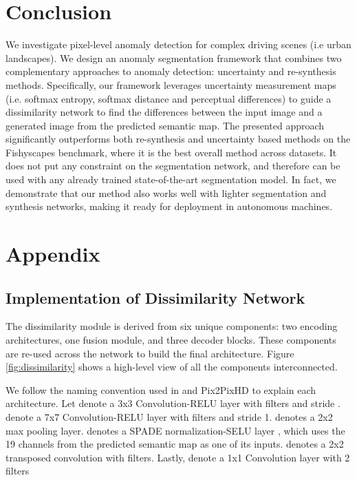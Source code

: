 \documentclass[final]{cvpr}
\begin{document}
 \section{Conclusion}
We investigate pixel-level anomaly detection for complex driving scenes (i.e urban landscapes).
We design an anomaly segmentation framework that combines two complementary approaches to anomaly detection: uncertainty and re-synthesis methods.
Specifically, our framework leverages uncertainty measurement maps (i.e. softmax entropy, softmax distance and perceptual differences) to guide a dissimilarity network to find the differences between the input image and a generated image from the predicted semantic map.
The presented approach significantly outperforms both re-synthesis and uncertainty based methods on the Fishyscapes benchmark, where it is the best overall method across datasets. It does not put any constraint on the segmentation network, and therefore can be used with any already trained state-of-the-art segmentation model. In fact, we demonstrate that our method also works well with lighter segmentation and synthesis networks, making it ready for deployment in autonomous machines.


 
{\small


}

\cleardoublepage
\appendix
\section{Appendix}
\label{appendix}
\subsection{Implementation of Dissimilarity Network}
\label{app:dissimilarity}
The dissimilarity module is derived from six unique components: two encoding architectures, one fusion module, and three decoder blocks. These components are re-used across the network to build the final architecture. Figure \ref{fig:dissimilarity} shows a high-level view of all the components interconnected.  

We follow the naming convention used in \cite{perceptual_diff} and Pix2PixHD \cite{Pix2PixHd} to explain each architecture. Let  denote a 3x3 Convolution-RELU layer with  filters and stride .  denote a 7x7 Convolution-RELU layer with  filters and stride 1.  denotes a 2x2 max pooling layer.  denotes a SPADE normalization-SELU layer \cite{SPADE,selu}, which uses the 19 channels from the predicted semantic map as one of its inputs.  denotes a 2x2 transposed convolution with  filters. Lastly,  denote a 1x1 Convolution layer with 2 filters 
\end{document}
